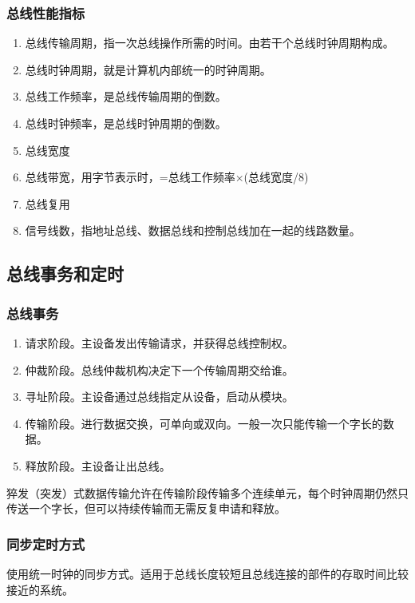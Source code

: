 \documentclass[12pt, a4paper, oneside]{ctexart}
\begin{document}
\subsubsection{总线性能指标}

\begin{enumerate}
  \item 总线传输周期，指一次总线操作所需的时间。由若干个总线时钟周期构成。
  \item 总线时钟周期，就是计算机内部统一的时钟周期。
  \item 总线工作频率，是总线传输周期的倒数。
  \item 总线时钟频率，是总线时钟周期的倒数。
  \item 总线宽度
  \item 总线带宽，用字节表示时，=总线工作频率$\times$(总线宽度/8)
  \item 总线复用
  \item 信号线数，指地址总线、数据总线和控制总线加在一起的线路数量。
\end{enumerate}

\subsection{总线事务和定时}

\subsubsection{总线事务}

\begin{enumerate}
  \item 请求阶段。主设备发出传输请求，并获得总线控制权。
  \item 仲裁阶段。总线仲裁机构决定下一个传输周期交给谁。
  \item 寻址阶段。主设备通过总线指定从设备，启动从模块。
  \item 传输阶段。进行数据交换，可单向或双向。一般一次只能传输一个字长的数据。
  \item 释放阶段。主设备让出总线。
\end{enumerate}

猝发（突发）式数据传输允许在传输阶段传输多个连续单元，每个时钟周期仍然只传送一个字长，但可以持续传输而无需反复申请和释放。

\subsubsection{同步定时方式}

使用统一时钟的同步方式。适用于总线长度较短且总线连接的部件的存取时间比较接近的系统。
\end{document}
